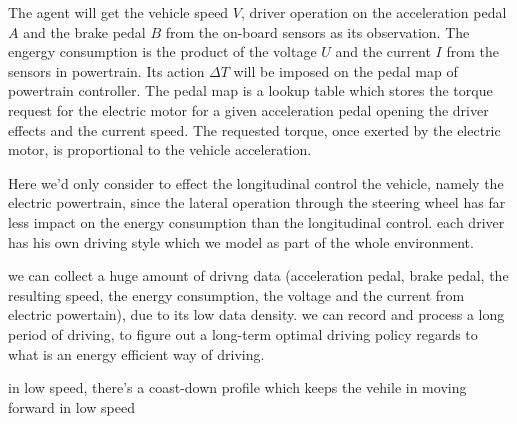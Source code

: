 \documentclass{article}
\begin{document}
The agent will get the vehicle speed $V$, driver operation on the acceleration pedal $A$ and the brake pedal $B$ from the on-board sensors as its observation. The engergy consumption is the product of the voltage $U$ and the current $I$ from the sensors in powertrain. Its action $\Delta T$ will be imposed on the pedal map of powertrain controller. The pedal map is a lookup table which stores the torque request for the electric motor for a given acceleration pedal opening the driver effects and the current speed. The requested torque, once exerted by the electric motor, is proportional to the vehicle acceleration.


Here we'd only consider to effect the longitudinal control the vehicle, namely the electric powertrain, since the lateral operation through the steering wheel has far less impact on the energy consumption than the longitudinal control.
each driver has his own driving style which we model as part of the whole environment.

we can collect a huge amount of drivng data (acceleration pedal, brake pedal, the resulting speed, the energy consumption, the voltage and the current from electric powertain), due to its low data density. we can record and process a long period of driving, to figure out a long-term optimal driving policy regards to what is an energy efficient way of driving.

in low speed, there's a coast-down profile which keeps the vehile in moving forward in low speed
\end{document}
